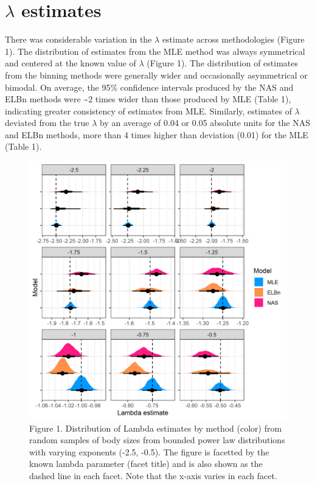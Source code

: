 \documentclass[
]{article}
\begin{document}
\hypertarget{lambda-estimates}{%
\section{\texorpdfstring{\(\lambda\)
estimates}{\textbackslash lambda estimates}}\label{lambda-estimates}}

There was considerable variation in the \(\lambda\) estimate across
methodologies (Figure 1). The distribution of estimates from the MLE
method was always symmetrical and centered at the known value of
\(\lambda\) (Figure 1). The distribution of estimates from the binning
methods were generally wider and occasionally asymmetrical or bimodal.
On average, the 95\% confidence intervals produced by the NAS and ELBn
methods were \textasciitilde2 times wider than those produced by MLE
(Table 1), indicating greater consistency of estimates from MLE.
Similarly, estimates of \(\lambda\) deviated from the true \(\lambda\)
by an average of 0.04 or 0.05 absolute units for the NAS and ELBn
methods, more than 4 times higher than deviation (0.01) for the MLE
(Table 1).

\begin{figure}
\centering
\includegraphics{figures/est_lambda_est_b_density.png}
\caption{Figure 1. Distribution of Lambda estimates by method (color)
from random samples of body sizes from bounded power law distributions
with varying exponents (-2.5, -0.5). The figure is facetted by the known
lambda parameter (facet title) and is also shown as the dashed line in
each facet. Note that the x-axis varies in each facet.}
\end{figure}
\end{document}
